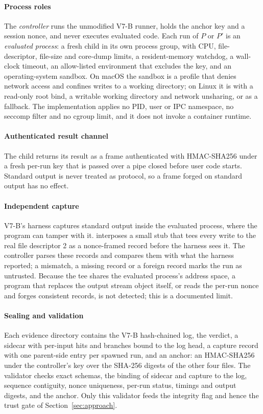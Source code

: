 \paragraph*{Process roles} The \emph{controller} runs the unmodified V7-B runner, holds the anchor key and a session nonce, and never executes evaluated code. Each run of $P$ or $P'$ is an \emph{evaluated process}: a fresh child in its own process group, with CPU, file-descriptor, file-size and core-dump limits, a resident-memory watchdog, a wall-clock timeout, an allow-listed environment that excludes the key, and an operating-system sandbox. On macOS the sandbox is a  profile that denies network access and confines writes to a working directory; on Linux it is  with a read-only root bind, a writable working directory and network unsharing, or  as a fallback. The implementation applies no PID, user or IPC namespace, no seccomp filter and no cgroup limit, and it does not invoke a container runtime.

\paragraph*{Authenticated result channel} The child returns its result as a frame authenticated with HMAC-SHA256 under a fresh per-run key that is passed over a pipe closed before user code starts. Standard output is never treated as protocol, so a frame forged on standard output has no effect.

\paragraph*{Independent capture} V7-B's harness captures standard output inside the evaluated process, where the program can tamper with it. \sbg{} interposes a small stub that tees every write to the real file descriptor 2 as a nonce-framed record before the harness sees it. The controller parses these records and compares them with what the harness reported; a mismatch, a missing record or a foreign record marks the run as untrusted. Because the tee shares the evaluated process's address space, a program that replaces the output stream object itself, or reads the per-run nonce and forges consistent records, is not detected; this is a documented limit.

\paragraph*{Sealing and validation} Each evidence directory contains the V7-B hash-chained log, the verdict, a sidecar with per-input hits and branches bound to the log head, a capture record with one parent-side entry per spawned run, and an anchor: an HMAC-SHA256 under the controller's key over the SHA-256 digests of the other four files. The validator checks exact schemas, the binding of sidecar and capture to the log, sequence contiguity, nonce uniqueness, per-run status, timings and output digests, and the anchor. Only this validator feeds the integrity flag and hence the trust gate of Section~\ref{sec:approach}.

